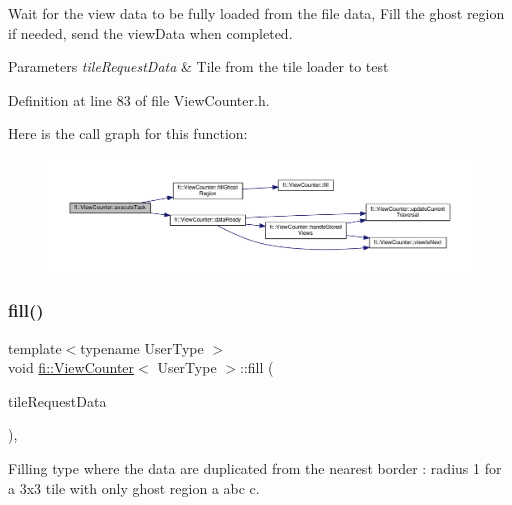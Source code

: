 Wait for the view data to be fully loaded from the file data, Fill the ghost region if needed, send the view\+Data when completed. 


\begin{DoxyParams}{Parameters}
{\em tile\+Request\+Data} & Tile from the tile loader to test \\
\hline
\end{DoxyParams}


Definition at line 83 of file View\+Counter.\+h.

Here is the call graph for this function\+:
\nopagebreak
\begin{figure}[H]
\begin{center}
\leavevmode
\includegraphics[width=350pt]{df/dae/classfi_1_1ViewCounter_a2c05a287109d15c0e33b6855545db65d_cgraph}
\end{center}
\end{figure}
\mbox{\label{classfi_1_1ViewCounter_ae583cf9ca69170e595208b2c4066c767}} 
\subsubsection{\texorpdfstring{fill()}{fill()}}
{\footnotesize\ttfamily template$<$typename User\+Type $>$ \\
void \hyperlink{classfi_1_1ViewCounter}{fi\+::\+View\+Counter}$<$ User\+Type $>$\+::fill (\begin{DoxyParamCaption}\item[{std\+::shared\+\_\+ptr$<$ \hyperlink{classfi_1_1HTGSTileRequestData}{fi\+::\+H\+T\+G\+S\+Tile\+Request\+Data}$<$ User\+Type $>$$>$}]{tile\+Request\+Data }\end{DoxyParamCaption})\hspace{0.3cm}{\ttfamily [inline]}, {\ttfamily [private]}}



Filling type where the data are duplicated from the nearest border \+: radius 1 for a 3x3 tile with only ghost region a abc c. 

